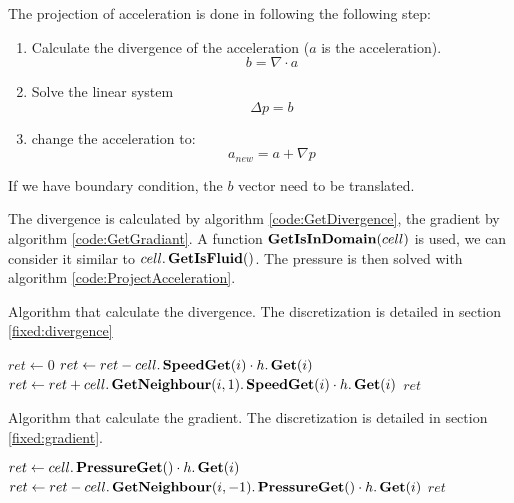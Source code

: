 The projection of acceleration is done in following the following step:
\begin{enumerate}
 \item Calculate the divergence of the acceleration ($a$ is the acceleration).
 \begin{equation}
  b=\nabla \cdot a
 \end{equation}
 \item Solve the linear system
 \begin{equation}
  \Delta p=b
 \end{equation}
 \item change the acceleration to:
 \begin{equation}
  a_{new}=a+\nabla p
 \end{equation}
\end{enumerate}

If we have boundary condition, the $b$ vector need to be translated.

The divergence is calculated by algorithm \ref{code:GetDivergence}, the gradient by algorithm \ref{code:GetGradiant}.
A function $\mathop{\textbf{GetIsInDomain}}(cell)$ is used, we can consider it similar to $cell.\mathop{\textbf{GetIsFluid}}()$.
The pressure is then solved with algorithm \ref{code:ProjectAcceleration}.

\begin{algorithm}
\caption{Algorithm that calculate the divergence. The discretization is detailed in section \ref{fixed:divergence}}
\label{code:GetDivergence}
\begin{algorithmic}[1]
		\State $ret\gets 0$
			\State $ret\gets ret-cell.\mathop{\textbf{SpeedGet}}(i)\cdot h.\mathop{\textbf{Get}}(i)$
			\State $ret\gets ret+cell.\mathop{\textbf{GetNeighbour}}(i,1).\mathop{\textbf{SpeedGet}}(i) \cdot h.\mathop{\textbf{Get}}(i)$
		\EndFor
		\State \Return $ret$
	\EndFunction
	 \end{algorithmic}
\end{algorithm}

\begin{algorithm}
\caption{Algorithm that calculate the gradient. The discretization is detailed in section \ref{fixed:gradient}.}
\label{code:GetGradiant}
\begin{algorithmic}[1]
		\State $ret\gets cell.\mathop{\textbf{PressureGet}}()\cdot h.\mathop{\textbf{Get}}(i)$
		\State $ret\gets ret-cell.\mathop{\textbf{GetNeighbour}}(i,-1).\mathop{\textbf{PressureGet}}()\cdot h.\mathop{\textbf{Get}}(i)$
		\State \Return $ret$
\EndFunction
		 \end{algorithmic}
\end{algorithm}

